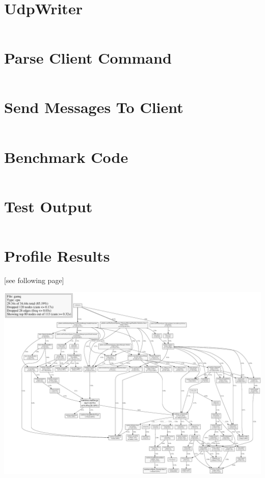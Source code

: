 \chapter{UdpWriter}
\label{appendix:udpWriter}

\inputminted[breaklines=true, breakanywhere]{go}{code/gamq/udp/udpwriter.go}

\chapter{Parse Client Command}
\label{appendix:parseClientCommand}

\inputminted[breaklines=true, breakanywhere, firstline=226, lastline=260]{go}{code/gamq/connectionmanager.go}

\chapter{Send Messages To Client}
\label{appendix:sendMessagesToClient}

\inputminted[breaklines=true, breakanywhere, firstline=35, lastline=67]{go}{code/gamq/messageshipper.go}

\chapter{Benchmark Code}
\label{chap:benchmarkCode}

\inputminted[breaklines]{python}{code/gamq/tools/benchmark/benchmark.py}

\chapter{Test Output}
\label{chap:testOutput}

\inputminted[breaklines]{bash}{code/goTestOutput}

\chapter{Profile Results}
\label{chap:profileResults}
\begin{center}
[see following page]
\end{center}
\begin{landscape}
\includegraphics[width=\textwidth]{figures/profileOutput}
\end{landscape}
